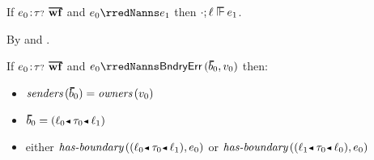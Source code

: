 \begin{theorem}\label{H-S-complete-monitoring}
  If\/ $\fwellformedO{\sexpr_0}{\stoptional}$
  and\/  $\sexpr_0 \rredNanns \sexpr_1$
  then\/ $\cdot; \sowner \sWSOP \sexpr_1$.
\end{theorem}
\begin{lamportproof}
  By  and .
\end{lamportproof}

\begin{theorem}\label{H-S-correct-blame}
  If\/ $\fwellformedO{\sexpr_0}{\stoptional}$
  and\/ $\sexpr_0 \rredNanns \boundaryerror{\sblist_0}{\svalue_0}$
  then:\leavevmode
  \begin{itemize}
    \item
      $\fblistsenders{\sblist_0} = \fvalueowners{\svalue_0}$
    \item
      $\sblist_0 = \obnd{\sowner_0}{\stype_0}{\sowner_1}$
    \item
      either $\fhasbnd{\obnd{\sowner_0}{\stype_0}{\sowner_1}}{\sexpr_0}$
      or $\fhasbnd{\obnd{\sowner_1}{\stype_0}{\sowner_0}}{\sexpr_0}$
  \end{itemize}
\end{theorem}
